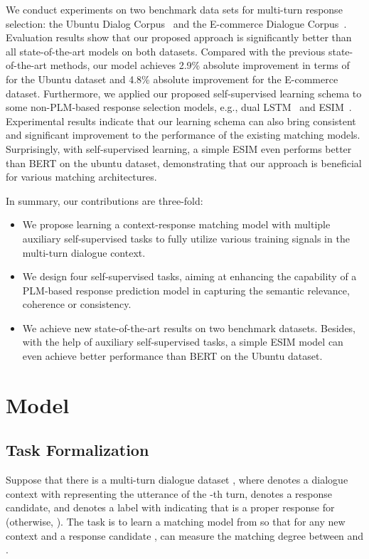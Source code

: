 \documentclass{article}
\begin{document}
We conduct experiments on two benchmark data sets for multi-turn response selection: the Ubuntu Dialog Corpus~\cite{lowe-etal-2015-ubuntu} and the E-commerce Dialogue Corpus~\cite{zhang-etal-2018-modeling}.
Evaluation results show that our proposed approach is significantly better than all state-of-the-art models on both datasets.
Compared with the previous state-of-the-art methods, our model achieves 2.9\% absolute improvement in terms of  for the Ubuntu dataset and 4.8\% absolute improvement for the E-commerce dataset.
Furthermore, we applied our proposed self-supervised learning schema to some non-PLM-based response selection models, e.g., dual LSTM~\cite{lowe-etal-2015-ubuntu} and ESIM~\cite{chen2019sequential}.
Experimental results indicate that our learning schema can also bring consistent and significant improvement to the performance of the existing matching models. Surprisingly, with self-supervised learning, a simple ESIM even performs better than BERT on the ubuntu dataset, demonstrating that our approach is beneficial for various matching architectures.


In summary, our contributions are three-fold:
\begin{itemize}
\item We propose learning a context-response matching model with multiple auxiliary self-supervised tasks to fully utilize various training signals in the multi-turn dialogue context.
\item We design four self-supervised tasks, aiming at enhancing the capability of a PLM-based response prediction model in capturing the semantic relevance, coherence or consistency. 
\item We  achieve new state-of-the-art results on two benchmark datasets. Besides, with the help of auxiliary self-supervised tasks, a simple ESIM model can even achieve better performance than BERT on the Ubuntu dataset.
\end{itemize}
 \section{Model}
\label{approach}

\subsection{Task Formalization}

Suppose that there is a multi-turn dialogue dataset , where  denotes a dialogue context with  representing the utterance of the -th turn,  denotes a response candidate, and  denotes a label with  indicating that  is a proper response for  (otherwise, ).
The task is to learn a matching model  from  so that for any new context  and a response candidate ,  can measure the matching degree between  and .
\end{document}
